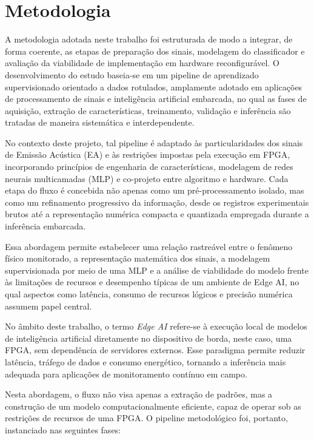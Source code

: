 \section{Metodologia}

A metodologia adotada neste trabalho foi estruturada de modo a integrar, de forma coerente, as etapas de preparação dos sinais, modelagem do classificador e avaliação da viabilidade de implementação em hardware reconfigurável. O desenvolvimento do estudo baseia-se em um pipeline de aprendizado supervisionado orientado a dados rotulados, amplamente adotado em aplicações de processamento de sinais e inteligência artificial embarcada, no qual as fases de aquisição, extração de características, treinamento, validação e inferência são tratadas de maneira sistemática e interdependente.

No contexto deste projeto, tal pipeline é adaptado às particularidades dos sinais de Emissão Acústica (EA) e às restrições impostas pela execução em FPGA, incorporando princípios de engenharia de características, modelagem de redes neurais multicamadas (MLP) e co-projeto entre algoritmo e hardware. Cada etapa do fluxo é concebida não apenas como um pré-processamento isolado, mas como um refinamento progressivo da informação, desde os registros experimentais brutos até a representação numérica compacta e quantizada empregada durante a inferência embarcada.

Essa abordagem permite estabelecer uma relação rastreável entre o fenômeno físico monitorado, a representação matemática dos sinais, a modelagem supervisionada por meio de uma MLP e a análise de viabilidade do modelo frente às limitações de recursos e desempenho típicas de um ambiente de Edge AI, no qual aspectos como latência, consumo de recursos lógicos e precisão numérica assumem papel central.

\noindent
No âmbito deste trabalho, o termo \textit{Edge AI} refere-se à execução local de
modelos de inteligência artificial diretamente no dispositivo de borda, neste
caso, uma FPGA, sem dependência de servidores externos. Esse paradigma permite
reduzir latência, tráfego de dados e consumo energético, tornando a inferência
mais adequada para aplicações de monitoramento contínuo em campo.

Nesta abordagem, o fluxo não visa apenas a extração de padrões, mas a construção de um modelo computacionalmente eficiente, capaz de operar sob as restrições de recursos de uma FPGA. O pipeline metodológico foi, portanto, instanciado nas seguintes fases:


